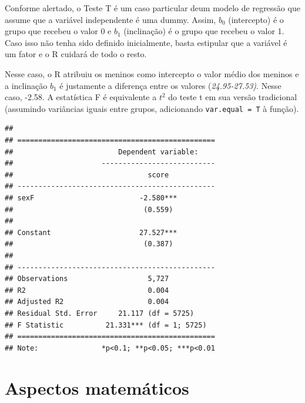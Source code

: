 \documentclass[
]{book}
\newenvironment{Shaded}{\begin{snugshade}}{\end{snugshade}}
\newcommand{\DataTypeTok}[1]{\textcolor[rgb]{0.13,0.29,0.53}{#1}}
\newcommand{\KeywordTok}[1]{\textcolor[rgb]{0.13,0.29,0.53}{\textbf{#1}}}
\newcommand{\NormalTok}[1]{#1}
\newcommand{\OperatorTok}[1]{\textcolor[rgb]{0.81,0.36,0.00}{\textbf{#1}}}
\newcommand{\StringTok}[1]{\textcolor[rgb]{0.31,0.60,0.02}{#1}}
\begin{document}
Conforme alertado, o Teste T é um caso particular deum modelo de regressão que assume que a variável independente é uma dummy. Assim, \(b_0\) (intercepto) é o grupo que recebeu o valor 0 e \(b_1\) (inclinação) é o grupo que recebeu o valor 1. Caso isso não tenha sido definido inicialmente, basta estipular que a variável é um fator e o R cuidará de todo o resto.

Nesse caso, o R atribuiu os meninos como intercepto o valor médio dos meninos e a inclinação \(b_1\) é justamente a diferença entre os valores (\emph{24.95-27.53)}. Nesse caso, -2.58. A estatística F é equivalente a \(t^2\) do teste t em sua versão tradicional (assumindo variâncias iguais entre grupos, adicionando \texttt{var.equal\ =\ T} à função).

\begin{Shaded}
\end{Shaded}

\begin{verbatim}
## 
## ===============================================
##                         Dependent variable:    
##                     ---------------------------
##                                score           
## -----------------------------------------------
## sexF                         -2.580***         
##                               (0.559)          
##                                                
## Constant                     27.527***         
##                               (0.387)          
##                                                
## -----------------------------------------------
## Observations                   5,727           
## R2                             0.004           
## Adjusted R2                    0.004           
## Residual Std. Error     21.117 (df = 5725)     
## F Statistic          21.331*** (df = 1; 5725)  
## ===============================================
## Note:               *p<0.1; **p<0.05; ***p<0.01
\end{verbatim}

\hypertarget{aspectos-matemuxe1ticos}{%
\section{Aspectos matemáticos}\label{aspectos-matemuxe1ticos}}
\end{document}
